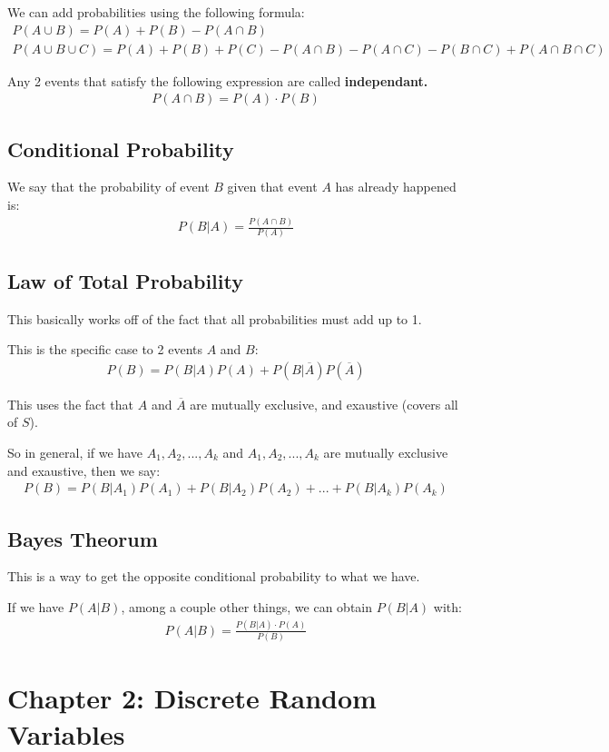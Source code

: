 \documentclass[12pt,letterpaper]{article} \usepackage{amsmath} \usepackage{graphicx} \usepackage[margin=1in]{geometry} \usepackage{longtable}  \usepackage{amssymb}
\begin{document}
	We can add probabilities using the following formula:
	\begin{align*}
		P(A\cup B) = P(A) + P(B) - P(A\cap B) \\
		P(A\cup B \cup C) = P(A)+P(B)+P(C)-P(A\cap B) - P(A\cap C) - P(B\cap C) + P(A\cap B\cap C)
	\end{align*}

	Any 2 events that satisfy the following expression are called \textbf{independant. }
	\begin{align*}
		P(A\cap B) = P(A)\cdot P(B)
	\end{align*}

	\subsection{Conditional Probability}
	We say that the probability of event $B$ given that event $A$ has already happened is:
	\begin{align*}
		P(B|A) = \frac{P(A\cap B)}{P(A)}
	\end{align*}
	
	\subsection{Law of Total Probability}
	This basically works off of the fact that all probabilities must add up to 1. 
	
	This is the specific case to 2 events $A$ and $B$:
	\begin{align*}
		P(B) = P(B|A)P(A) + P(B|\overline A)P(\overline A)
	\end{align*}

	This uses the fact that $A$ and $\overline A$ are mutually exclusive, and exaustive (covers all of $S$). 
	
	So in general, if we have $A_1, A_2, ..., A_k$ and $A_1, A_2, ..., A_k$ are mutually exclusive and exaustive, then we say:
	\begin{align*}
		P(B) = P(B|A_1)P(A_1) + P(B|A_2)P(A_2) + ... + P(B|A_k)P(A_k)
	\end{align*}
	
	\subsection{Bayes Theorum}
	This is a way to get the opposite conditional probability to what we have. 
	
	If we have $P(A|B)$, among a couple other things, we can obtain $P(B|A)$ with:
	\begin{align*}
		P(A|B) = \frac{P(B|A)\cdot P(A)}{P(B)}
	\end{align*}
	
	\section{Chapter 2: Discrete Random Variables}
	
\end{document}
